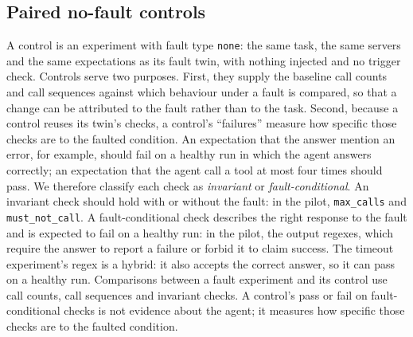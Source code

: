 \subsection{Paired no-fault controls}

A control is an experiment with fault type \texttt{none}: the same task, the same servers and the same expectations as its fault twin, with nothing injected and no trigger check. Controls serve two purposes. First, they supply the baseline call counts and call sequences against which behaviour under a fault is compared, so that a change can be attributed to the fault rather than to the task. Second, because a control reuses its twin's checks, a control's ``failures'' measure how specific those checks are to the faulted condition. An expectation that the answer mention an error, for example, should fail on a healthy run in which the agent answers correctly; an expectation that the agent call a tool at most four times should pass. We therefore classify each check as \emph{invariant} or \emph{fault-conditional}. An invariant check should hold with or without the fault: in the pilot, \texttt{max\_calls} and \texttt{must\_not\_call}. A fault-conditional check describes the right response to the fault and is expected to fail on a healthy run: in the pilot, the output regexes, which require the answer to report a failure or forbid it to claim success. The timeout experiment's regex is a hybrid: it also accepts the correct answer, so it can pass on a healthy run. Comparisons between a fault experiment and its control use call counts, call sequences and invariant checks. A control's pass or fail on fault-conditional checks is not evidence about the agent; it measures how specific those checks are to the faulted condition.
